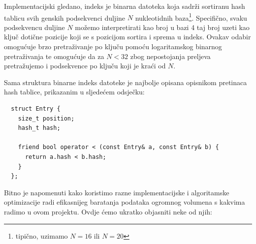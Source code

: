 \documentclass[times, utf8, diplomski]{fer}
\begin{document}
Implementacijski gledano, indeks je binarna datoteka koja sadrži sortiranu hash tablicu svih genskih podsekvenci
duljine $N$ nukleotidnih baza\footnote{tipično, uzimamo $N = 16$ ili $N = 20$}. Specifično, svaku podsekvencu
duljine $N$ možemo interpretirati kao broj u bazi 4 taj broj uzeti kao ključ dotične pozicije koji se s pozicijom
sortira i sprema u indeks. Ovakav odabir omogućuje brzo pretraživanje po ključu pomoću logaritamskog binarnog 
pretraživanja te omogućuje da za $N < 32$ zbog nepostojanja preljeva pretražujemo i podsekvence po ključu koji
je kraći od $N$.

Sama struktura binarne indeks datoteke je najbolje opisana opisnikom pretinaca hash tablice, prikazanim u sljedećem
odsječku:

\begin{lstlisting}
  struct Entry {
    size_t position;
    hash_t hash;

    friend bool operator < (const Entry& a, const Entry& b) {
      return a.hash < b.hash;
    }
  };
\end{lstlisting}

Bitno je napomenuti kako koristimo razne implementacijske i algoritamske optimizacije radi efikasnijeg
baratanja podataka ogromnog volumena s kakvima radimo u ovom projektu. Ovdje ćemo ukratko objasniti neke od njih:
\end{document}
